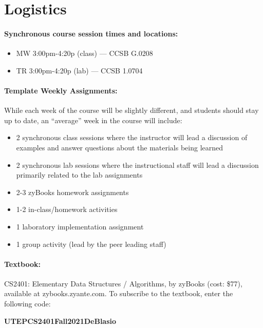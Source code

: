 \documentclass[12pt]{scrartcl}
\begin{document}
\clearpage
\tableofcontents

\section{Logistics}
\paragraph{Synchronous course session times and locations:}
\begin{itemize}
\item MW 3:00pm-4:20p (class) --- CCSB G.0208
\item TR 3:00pm-4:20p (lab) --- CCSB 1.0704
\end{itemize}

\paragraph{Template Weekly Assignments:} While each week of the course will be slightly different, and students should stay up to date, an ``average'' week in the course will include:
\begin{itemize}
\item 2 synchronous class sessions where the instructor will lead a discussion of examples and answer questions about the materials being learned
\item 2 synchronous lab sessions where the  instructional staff will lead a discussion primarily related to the lab assignments
\item 2-3 zyBooks homework assignments
\item 1-2 in-class/homework activities
\item 1 laboratory implementation assignment
\item 1 group activity (lead by the peer leading staff) 
\end{itemize}

\paragraph{Textbook:} CS2401: Elementary Data Structures / Algorithms, by zyBooks (cost: \$77), available at zybooks.zyante.com. To subscribe to the textbook,  enter the following code: 
\begin{center}
\textbf{\Large UTEPCS2401Fall2021DeBlasio}
\end{center}
\end{document}
